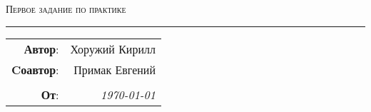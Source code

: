 
\begin{center}
    \Large \textsc{Первое задание по практике 
    }
\end{center}

\hrule

\phantom{42}

\begin{flushright}
    \begin{tabular}{rr}
        \textbf{Автор}: 
        & Хоружий Кирилл \\
        \textbf{Cоавтор}: 
        & Примак Евгений \\
        & \\
        \textbf{От}: &
        \textit{\today}\\
    \end{tabular}
\end{flushright}

